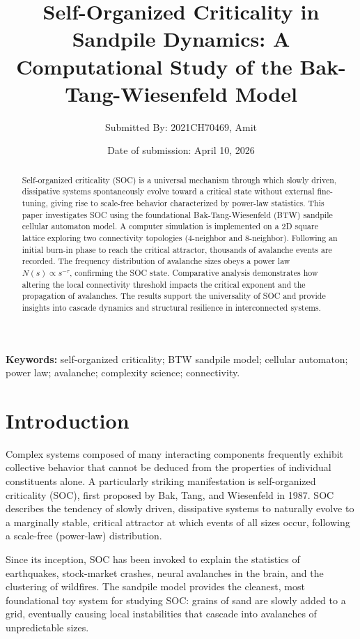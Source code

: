 \documentclass[11pt, a4paper]{article}
\title{\textbf{Self-Organized Criticality in Sandpile Dynamics: A Computational Study of the Bak-Tang-Wiesenfeld Model}}
\author{Submitted By: 2021CH70469, Amit}
\date{Date of submission: April 10, 2026}
\begin{document}
\maketitle

\begin{abstract}
Self-organized criticality (SOC) is a universal mechanism through which slowly driven, dissipative systems spontaneously evolve toward a critical state without external fine-tuning, giving rise to scale-free behavior characterized by power-law statistics. This paper investigates SOC using the foundational Bak-Tang-Wiesenfeld (BTW) sandpile cellular automaton model. A computer simulation is implemented on a 2D square lattice exploring two connectivity topologies (4-neighbor and 8-neighbor). Following an initial burn-in phase to reach the critical attractor, thousands of avalanche events are recorded. The frequency distribution of avalanche sizes obeys a power law $N(s) \propto s^{-\tau}$, confirming the SOC state. Comparative analysis demonstrates how altering the local connectivity threshold impacts the critical exponent and the propagation of avalanches. The results support the universality of SOC and provide insights into cascade dynamics and structural resilience in interconnected systems.
\end{abstract}

\textbf{Keywords:} self-organized criticality; BTW sandpile model; cellular automaton; power law; avalanche; complexity science; connectivity.

\section{Introduction}
Complex systems composed of many interacting components frequently exhibit collective behavior that cannot be deduced from the properties of individual constituents alone. A particularly striking manifestation is self-organized criticality (SOC), first proposed by Bak, Tang, and Wiesenfeld in 1987. SOC describes the tendency of slowly driven, dissipative systems to naturally evolve to a marginally stable, critical attractor at which events of all sizes occur, following a scale-free (power-law) distribution.

Since its inception, SOC has been invoked to explain the statistics of earthquakes, stock-market crashes, neural avalanches in the brain, and the clustering of wildfires. The sandpile model provides the cleanest, most foundational toy system for studying SOC: grains of sand are slowly added to a grid, eventually causing local instabilities that cascade into avalanches of unpredictable sizes.
\end{document}
